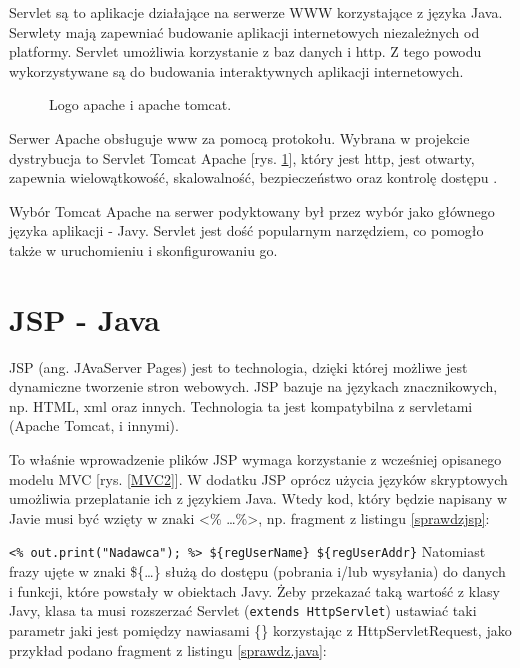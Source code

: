 \documentclass[eng,printmode,oneside]{mgr}
\begin{document}
Servlet są to aplikacje działające na serwerze WWW korzystające z języka Java.
Serwlety mają zapewniać budowanie aplikacji internetowych niezależnych od
platformy. Servlet umożliwia korzystanie z baz danych i http. Z tego powodu
wykorzystywane są do budowania interaktywnych aplikacji internetowych. 

\begin{figure}
\centering
\caption{\label{apache}Logo apache i apache tomcat.}
\end{figure}

Serwer Apache obsługuje www za pomocą protokołu. Wybrana w projekcie dystrybucja
to Servlet Tomcat Apache [rys. \ref{apache}], który jest http, jest otwarty,
zapewnia wielowątkowość, skalowalność, bezpieczeństwo oraz kontrolę dostępu
\cite{apache.wiki}.

Wybór Tomcat Apache na serwer podyktowany był przez wybór jako głównego języka
aplikacji - Javy. Servlet jest dość popularnym narzędziem, co pomogło także w
uruchomieniu i skonfigurowaniu go.

\section{JSP - Java}

JSP (ang. JAvaServer Pages) jest to technologia, dzięki której możliwe jest
dynamiczne tworzenie stron webowych. JSP bazuje na językach znacznikowych, np.
HTML, xml oraz innych. Technologia ta jest kompatybilna z servletami (Apache
Tomcat, i innymi).

To właśnie wprowadzenie plików JSP wymaga korzystanie z wcześniej
opisanego modelu MVC [rys. \ref{MVC2}]. W dodatku JSP oprócz użycia języków
skryptowych umożliwia przeplatanie ich z językiem Java. Wtedy kod, który będzie
napisany w Javie musi być wzięty w znaki <\% \ldots \%>, np. fragment z listingu
\ref{sprawdzjsp}:

\texttt{<\% out.print("Nadawca"); \%> \$\{regUserName\}
\$\{regUserAddr\}}
Natomiast frazy ujęte w znaki \$\{\ldots\} służą do dostępu (pobrania
i/lub wysyłania) do danych i funkcji, które powstały w obiektach Javy. Żeby
przekazać taką wartość z klasy Javy, klasa ta musi rozszerzać Servlet
(\texttt{extends HttpServlet}) ustawiać taki parametr jaki jest pomiędzy
nawiasami \{\} korzystając z HttpServletRequest, jako przykład podano fragment z
listingu \ref{sprawdz.java}:
\end{document}
